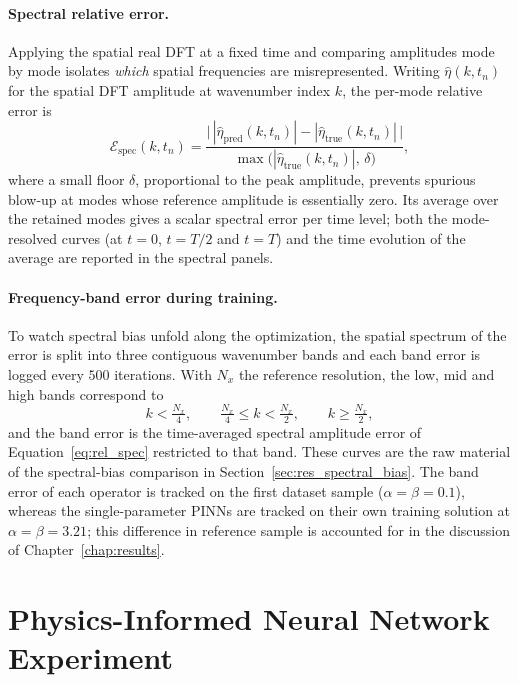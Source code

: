 \paragraph{Spectral relative error.} Applying the spatial real DFT at a fixed time and comparing amplitudes mode by mode isolates \emph{which} spatial frequencies are misrepresented. Writing $\hat\eta(k, t_n)$ for the spatial DFT amplitude at wavenumber index $k$, the per-mode relative error is
\begin{equation}\label{eq:rel_spec}
    \mathcal{E}_{\text{spec}}(k, t_n) = \frac{\bigl| \, |\hat\eta_{\text{pred}}(k,t_n)| - |\hat\eta_{\text{true}}(k,t_n)| \, \bigr|}{\max\!\bigl(|\hat\eta_{\text{true}}(k,t_n)|,\, \delta\bigr)},
\end{equation}
where a small floor $\delta$, proportional to the peak amplitude, prevents spurious blow-up at modes whose reference amplitude is essentially zero. Its average over the retained modes gives a scalar spectral error per time level; both the mode-resolved curves (at $t = 0$, $t = T/2$ and $t = T$) and the time evolution of the average are reported in the spectral panels.

\paragraph{Frequency-band error during training.} To watch spectral bias unfold along the optimization, the spatial spectrum of the error is split into three contiguous wavenumber bands and each band error is logged every $500$ iterations. With $N_x$ the reference resolution, the low, mid and high bands correspond to
\begin{equation}\label{eq:bands}
    k < \tfrac{N_x}{4}, \qquad \tfrac{N_x}{4} \le k < \tfrac{N_x}{2}, \qquad k \ge \tfrac{N_x}{2},
\end{equation}
and the band error is the time-averaged spectral amplitude error of Equation~\eqref{eq:rel_spec} restricted to that band. These curves are the raw material of the spectral-bias comparison in Section~\ref{sec:res_spectral_bias}. The band error of each operator is tracked on the first dataset sample ($\alpha = \beta = 0.1$), whereas the single-parameter PINNs are tracked on their own training solution at $\alpha = \beta = 3.21$; this difference in reference sample is accounted for in the discussion of Chapter~\ref{chap:results}.

\section{Physics-Informed Neural Network Experiment}
\label{sec:met_pinn}

